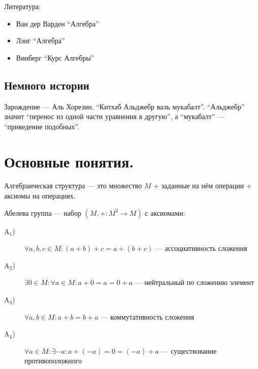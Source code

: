 \documentclass[12pt,a4paper]{article}
\date{}
\newcommand{\A}{\ensuremath{\mathrm{A}}\xspace}
\begin{document}
    \maketitle

    \listoftodos[TODOs]

    \tableofcontents

    \vspace{2em}

    Литература:
    \begin{itemize}
        \item Ван дер Варден ``Алгебра''
        \item Лэнг ``Алгебра''
        \item Винберг ``Курс Алгебры''
    \end{itemize}

    \subsection*{Немного истории}

    Зарождение --- Аль Хорезин, ``Китхаб Альджебр валь мукабалт''. ``Альджебр'' значит ``перенос из одной части уравнения в другую'', а ``мукабалт'' --- ``приведение подобных''.

    \section{Основные понятия.}

    \begin{definition}
        Алгебраическая структура --- это множество $M$ + заданные на нём операции + аксиомы на операциях.
    \end{definition}

    \begin{definition}
        Абелева группа --- набор $(M, +: M^2 \to M)$ с аксиомами:
        \begin{description}
            \item[$\A_1$)] $\forall a, b, c \in M: (a + b) + c = a + (b + c)$ --- ассоциативность сложения
            \item[$\A_2$)] $\exists 0 \in M: \forall a \in M: a + 0 = a = 0 + a$ --- нейтральный по сложению элемент
            \item[$\A_3$)] $\forall a, b \in M: a + b = b + a$ --- коммутативность сложения
            \item[$\A_4$)] $\forall a \in M: \exists -a: a + (-a) = 0 = (-a) + a$ --- существование противоположного
        \end{description}
    \end{definition}
\end{document}
